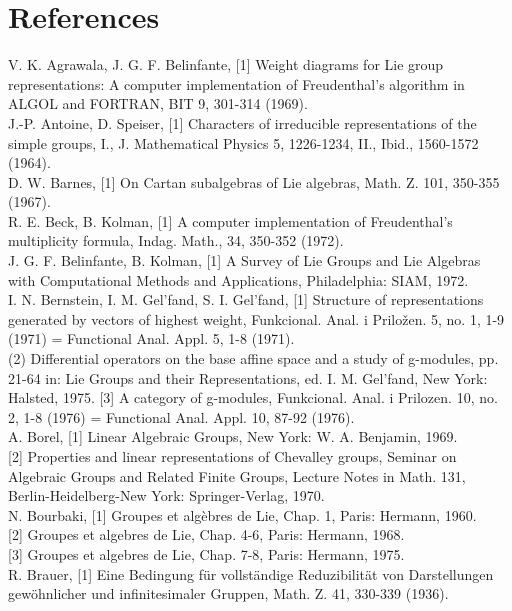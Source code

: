 \documentclass[10pt]{article}
\begin{document}
\section*{References}
V. K. Agrawala, J. G. F. Belinfante, [1] Weight diagrams for Lie group representations: A computer implementation of Freudenthal's algorithm in ALGOL and FORTRAN, BIT 9, 301-314 (1969).\\[0pt]
J.-P. Antoine, D. Speiser, [1] Characters of irreducible representations of the simple groups, I., J. Mathematical Physics 5, 1226-1234, II., Ibid., 1560-1572 (1964).\\[0pt]
D. W. Barnes, [1] On Cartan subalgebras of Lie algebras, Math. Z. 101, 350-355 (1967).\\[0pt]
R. E. Beck, B. Kolman, [1] A computer implementation of Freudenthal's multiplicity formula, Indag. Math., 34, 350-352 (1972).\\[0pt]
J. G. F. Belinfante, B. Kolman, [1] A Survey of Lie Groups and Lie Algebras with Computational Methods and Applications, Philadelphia: SIAM, 1972.\\[0pt]
I. N. Bernstein, I. M. Gel'fand, S. I. Gel'fand, [1] Structure of representations generated by vectors of highest weight, Funkcional. Anal. i Priložen. 5, no. 1, 1-9 (1971) = Functional Anal. Appl. 5, 1-8 (1971).\\[0pt]
(2) Differential operators on the base affine space and a study of g-modules, pp. 21-64 in: Lie Groups and their Representations, ed. I. M. Gel'fand, New York: Halsted, 1975. [3] A category of g-modules, Funkcional. Anal. i Prilozen. 10, no. 2, 1-8 (1976) = Functional Anal. Appl. 10, 87-92 (1976).\\[0pt]
A. Borel, [1] Linear Algebraic Groups, New York: W. A. Benjamin, 1969.\\[0pt]
[2] Properties and linear representations of Chevalley groups, Seminar on Algebraic Groups and Related Finite Groups, Lecture Notes in Math. 131, Berlin-Heidelberg-New York: Springer-Verlag, 1970.\\[0pt]
N. Bourbaki, [1] Groupes et algèbres de Lie, Chap. 1, Paris: Hermann, 1960.\\[0pt]
[2] Groupes et algebres de Lie, Chap. 4-6, Paris: Hermann, 1968.\\[0pt]
[3] Groupes et algebres de Lie, Chap. 7-8, Paris: Hermann, 1975.\\[0pt]
R. Brauer, [1] Eine Bedingung für vollständige Reduzibilität von Darstellungen gewöhnlicher und infinitesimaler Gruppen, Math. Z. 41, 330-339 (1936).\\[0pt]
\end{document}
